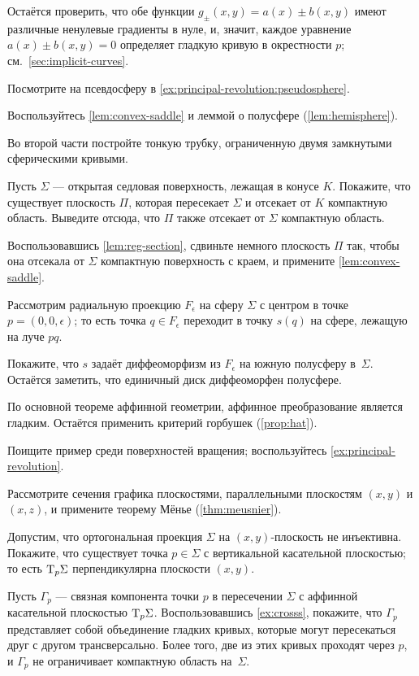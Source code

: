 \begin{multicols}{2}
Остаётся проверить, что обе функции $g_\pm(x,y)=a(x)\pm b(x,y)$ имеют различные ненулевые градиенты в нуле, и, значит, каждое уравнение $a(x)\pm b(x,y) =0$ определяет гладкую кривую в окрестности $p$;
см.~\ref{sec:implicit-curves}.

Посмотрите на псевдосферу в \ref{ex:principal-revolution:pseudosphere}.

Воспользуйтесь \ref{lem:convex-saddle} и леммой о полусфере (\ref{lem:hemisphere}).

Во второй части постройте тонкую трубку, ограниченную двумя замкнутыми сферическими кривыми.

Пусть $\Sigma$ --- открытая седловая поверхность, лежащая в конусе $K$.
Покажите, что существует плоскость $\Pi$, которая пересекает $\Sigma$ и отсекает от $K$ компактную область.
Выведите отсюда, что $\Pi$ также отсекает от $\Sigma$ компактную область.

Воспользовавшись \ref{lem:reg-section}, сдвиньте немного плоскость $\Pi$ так, чтобы она отсекала от $\Sigma$ компактную поверхность с краем, и примените \ref{lem:convex-saddle}.

Рассмотрим радиальную проекцию $F_\epsilon$ на сферу $\Sigma$ с центром в точке $p=(0,0,\epsilon)$;
то есть точка $q\in F_\epsilon$ переходит в точку $s(q)$ на сфере, лежащую на луче $pq$.

Покажите, что $s$ задаёт диффеоморфизм из $F_\epsilon$ на южную полусферу в~$\Sigma$.
Остаётся заметить, что единичный диск диффеоморфен полусфере.

По основной теореме аффинной геометрии, аффинное преобразование является гладким.
Остаётся применить критерий горбушек (\ref{prop:hat}).

Поищите пример среди поверхностей вращения;
воспользуйтесь \ref{ex:principal-revolution}.

Рассмотрите сечения графика плоскостями, параллельными плоскостям $(x,y)$ и $(x,z)$, и примените теорему Мёнье (\ref{thm:meusnier}).

Допустим, что ортогональная проекция $\Sigma$ на $(x,y)$-плоскость не инъективна.
Покажите, что существует точка $p\in\Sigma$ с вертикальной касательной плоскостью;
то есть $\mathrm{T}_p\Sigma$ перпендикулярна плоскости $(x,y)$.

Пусть $\Gamma_p$ --- связная компонента точки $p$ в пересечении $\Sigma$ с аффинной касательной плоскостью $\mathrm{T}_p\Sigma$.
Воспользовавшись \ref{ex:crosss}, покажите, что $\Gamma_p$ представляет собой объединение гладких кривых, которые могут пересекаться друг с другом трансверсально.
Более того, две из этих кривых проходят через $p$, и $\Gamma_p$ не ограничивает компактную область на~$\Sigma$.


\end{multicols}
